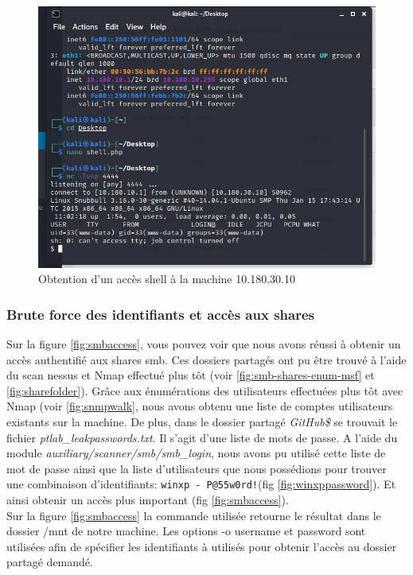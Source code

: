 \documentclass[french,paper=a4,oneside,captions=tableheading]{article}
\begin{document}
\begin{figure}[H]
    \centering
    \includegraphics[width=0.70\linewidth]{images/shell-php.png}
    \caption{Obtention d'un accès shell à la machine 10.180.30.10}
    \label{fig:shell-php}
\end{figure}



\subsubsection{Brute force des identifiants et accès aux shares}

Sur la figure \ref{fig:smbaccess}, vous pouvez voir que nous avons réussi à obtenir un accès authentifié aux shares smb. Ces dossiers partagés ont pu être trouvé à l'aide du scan nessus et Nmap effectué plus tôt (voir \ref{fig:smb-shares-enum-msf} et \ref{fig:sharefolder}). Grâce aux énumérations des utilisateurs effectuées plus tôt avec Nmap (voir \ref{fig:snmpwalk}, nous avons obtenu une liste de comptes utilisateurs existants sur la machine. De plus, dans le dossier partagé \textit{GitHub\$} se trouvait le fichier \textit{ptlab\_leakpasswords.txt}. Il s'agit d'une liste de mots de passe. A l'aide du module \textit{auxiliary/scanner/smb/smb\_login}, nous avons pu utilisé cette liste de mot de passe ainsi que la liste d'utilisateurs que nous possédions pour trouver une combinaison d'identifiants: \texttt{winxp - P@55w0rd!}(fig \ref{fig:winxppassword}). Et ainsi obtenir un accès plus important (fig \ref{fig:smbaccess}).\\

Sur la figure \ref{fig:smbaccess} la commande utilisée retourne le résultat dans le dossier /mnt de notre machine.
Les options -o username et password sont utilisées afin de spécifier les identifiants à utilisés pour obtenir l'accès au dossier partagé demandé.
\end{document}
